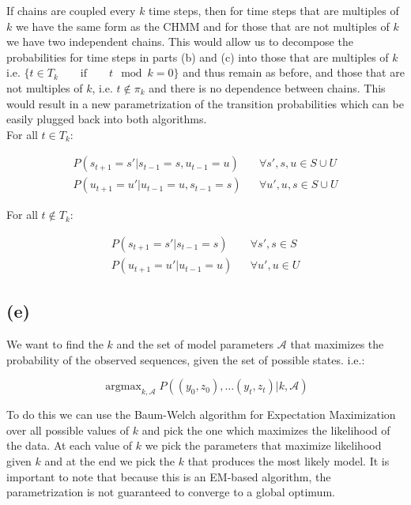 \documentclass[11pt]{amsart}
\DeclareMathOperator*{\argmax}{argmax}
\begin{document}
If chains are coupled every $k$ time steps, then for time steps that are multiples of $k$ we have the same form as the CHMM and for those that are not multiples of $k$ we have two independent chains. This would allow us to decompose the probabilities for time steps in parts (b) and (c) into those that are multiples of $k$ i.e. $\{ t \in T_{k} \qquad \text{if} \qquad t \mod k = 0 \}$  and thus remain as before, and those that are not multiples of $k$, i.e. $t \notin \pi_k$ and there is no dependence between chains. This would result in a new parametrization of the transition probabilities which can be easily plugged back into both algorithms. \\


For all $t \in T_k$:

\begin{equation}
\begin{aligned}
P(s_{t+1} = s' \vert s_{t-1} = s, u_{t-1} = u) && \forall s', s, u \in S \cup U\\
P(u_{t+1} = u' \vert u_{t-1} = u, s_{t-1} = s) && \forall u', u, s \in S \cup U
\end{aligned}
\end{equation}

For all $t \notin T_k$:

\begin{equation}
\begin{aligned}
P(s_{t+1} = s' \vert s_{t-1} = s) && \forall s', s \in S\\
P(u_{t+1} = u' \vert u_{t-1} = u) && \forall u', u \in  U
\end{aligned}
\end{equation}

\subsection{(e)}

We want to find the $k$ and the set of model parameters $\mathcal{A}$  that maximizes the probability of the observed sequences, given the set of possible states. i.e.:

\begin{equation}
\argmax_{k, \mathcal{A}} P((y_0, z_0),...(y_t, z_t) \vert k, \mathcal{A})
\end{equation}

To do this we can use the Baum-Welch algorithm for Expectation Maximization over all possible values of $k$ and pick the one which maximizes the likelihood of the data. At each value of $k$ we pick the parameters that maximize likelihood given $k$ and at the end we pick the $k$ that produces the most likely model. It is important to note that because this is an EM-based algorithm, the parametrization is not guaranteed to converge to a global optimum.
\end{document}
